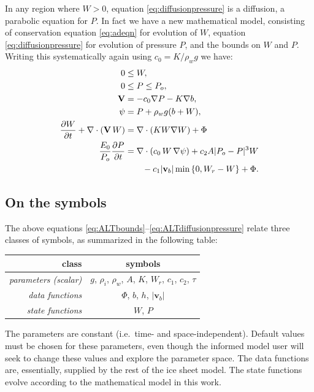 \documentclass[12pt,final]{amsart}%
\newcommand\bv{\mathbf{v}}
\newcommand\bV{\mathbf{V}}
\newcommand{\Div}{\nabla\cdot}
\newcommand{\grad}{\nabla}
\begin{document}
In any region where $W>0$, equation \eqref{eq:diffusionpressure} is a diffusion, a parabolic equation for $P$.  In fact we have a new mathematical model, consisting of conservation equation \eqref{eq:adeqn} for evolution of $W$, equation \eqref{eq:diffusionpressure} for evolution of pressure $P$, and the bounds on $W$ and $P$.  Writing this systematically again using $c_0 = K / \rho_w g$ we have:
\begin{align}
0 &\le W, \label{eq:ALTWbound} \\
0 &\le P \le P_o, \label{eq:ALTbounds} \\
\bV &= - c_0 \grad P - K \grad b, \label{eq:ALTvexpression} \\
\psi &= P + \rho_w g (b + W), \label{eq:ALTpotential} \\
\frac{\partial W}{\partial t} + \Div\left(\bV\, W\right) &= \Div \left(K W \grad W\right) + \Phi \label{eq:ALTadeqn} \\
\frac{E_0}{P_o} \frac{\partial P}{\partial t} &= \Div \left(c_0\,W\, \grad \psi \right) + c_2 A |P_o - P|^3 W \label{eq:ALTdiffusionpressure} \\
  &\qquad - c_1 |\bv_b| \min\left\{0,W_r - W\right\} + \Phi. \notag
\end{align}


\subsection*{On the symbols}  The above equations \eqref{eq:ALTbounds}--\eqref{eq:ALTdiffusionpressure} relate three classes of symbols, as summarized in the following table:

\begin{table}[h]
\begin{tabular}{r|c}
class & symbols \\ \hline
\emph{parameters (scalar)} & $g$, $\rho_i$, $\rho_w$, $A$, $K$, $W_r$, $c_1$, $c_2$, $\tau$ \\
\emph{data functions} & $\Phi$, $b$, $h$, $|\bv_b|$ \\
\emph{state functions} & $W$, $P$
\end{tabular}
\end{table}

\noindent The parameters are constant (i.e.~time- and space-independent).  Default values must be chosen for these parameters, even though the informed model user will seek to change these values and explore the parameter space.  The data functions are, essentially, supplied by the rest of the ice sheet model.  The state functions evolve according to the mathematical model in this work.
\end{document}

